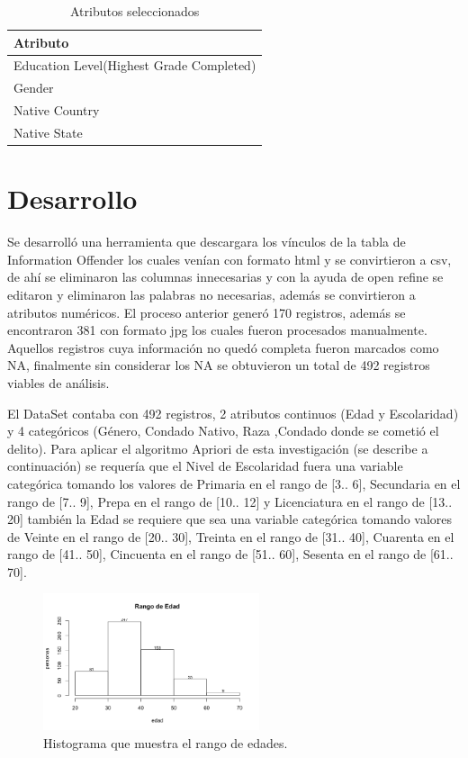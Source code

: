 \documentclass[sigconf]{acmart}
\begin{document}
\begin{table}[!hbt]
\begin{center}
\begin{tabular}{|l|}
\hline
Atributo\\
\hline
Education Level(Highest Grade Completed)\\
Gender\\
Native Country\\
Native State\\
\hline
\end{tabular}
\caption{Atributos seleccionados}
\label{tab:offender}
\end{center}
\end{table}


\section{Desarrollo}
Se desarrolló una herramienta que descargara los vínculos de la tabla de Information Offender los cuales venían con formato html y se convirtieron a csv, de ahí se eliminaron las columnas innecesarias y con la ayuda de open refine se editaron y eliminaron las palabras no necesarias, además se convirtieron a atributos numéricos. El proceso anterior generó 170 registros, además se encontraron 381 con formato jpg los cuales fueron procesados manualmente.
Aquellos registros cuya información no quedó completa fueron marcados como NA, finalmente sin considerar los NA se obtuvieron un total de 492 registros viables de análisis.


El DataSet contaba con 492 registros, 2 atributos continuos (Edad y Escolaridad) y 4 categóricos (Género, Condado Nativo, Raza ,Condado donde se cometió el delito). Para aplicar el algoritmo Apriori de esta investigación (se describe a continuación) se requería que el Nivel de Escolaridad fuera una variable categórica tomando los valores de Primaria en el rango de [3.. 6], Secundaria en el rango de  [7.. 9], Prepa en el rango de  [10.. 12] y Licenciatura en el rango de  [13.. 20] también la Edad se requiere que sea una variable categórica tomando valores de Veinte en el rango de [20.. 30], Treinta en el rango de [31.. 40], Cuarenta en el rango de [41.. 50], Cincuenta en el rango de [51.. 60], Sesenta en el rango de [61.. 70].


\begin{figure}[ht]
  \centering
  \includegraphics[width=2.5in]{Rplot.png}
  \caption{Histograma que muestra el rango de edades.}
  \label{fig:rangoEdad}
\end{figure}
\end{document}
